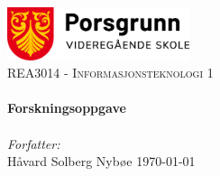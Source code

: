 \begin{titlepage}
\vbox{ }

\vbox{ }

\begin{center}
\includegraphics[width=0.40\textwidth]{img/porsgrunn-vgs.png}\\[1cm]
\textsc{\Large REA3014 - Informasjonsteknologi 1}\\[0.6cm]

\vbox{ }
\noindent\makebox[\linewidth]{\rule{.7\paperwidth}{1.5pt}}\\[0.8cm]
{ \huge \bfseries Forskningsoppgave}\\[0.4cm]
\noindent\makebox[\linewidth]{\rule{.7\paperwidth}{1.5pt}}\\[1.5cm]
\large
\emph{Forfatter:}\\[1mm]
Håvard Solberg Nybøe
\vfill
{\large \today}
\end{center}
\end{titlepage}